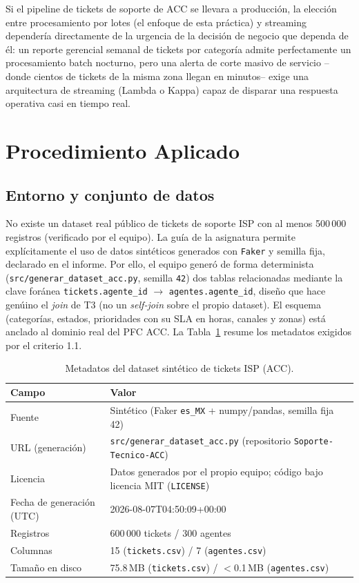 \documentclass[11pt,a4paper]{article}
\begin{document}
Si el pipeline de tickets de soporte de ACC se llevara a producci\'on, la
elecci\'on entre procesamiento por lotes (el enfoque de esta pr\'actica) y
streaming depender\'ia directamente de la urgencia de la decisi\'on de
negocio que dependa de \'el: un reporte gerencial semanal de tickets por
categor\'ia admite perfectamente un procesamiento batch nocturno, pero una
alerta de corte masivo de servicio --donde cientos de tickets de la misma
zona llegan en minutos-- exige una arquitectura de streaming (Lambda o Kappa)
capaz de disparar una respuesta operativa casi en tiempo real.

\section{Procedimiento Aplicado}
\label{sec:procedimiento}

\subsection{Entorno y conjunto de datos}
\label{sec:dataset}

No existe un dataset real p\'ublico de tickets de soporte ISP con al menos
500\,000 registros (verificado por el equipo). La gu\'ia de la asignatura
permite expl\'icitamente el uso de datos sint\'eticos generados con
\texttt{Faker} y semilla fija, declarado en el informe. Por ello, el equipo
gener\'o de forma determinista (\texttt{src/generar\_dataset\_acc.py},
semilla \texttt{42}) dos tablas relacionadas mediante la clave for\'anea
\texttt{tickets.agente\_id} $\rightarrow$ \texttt{agentes.agente\_id}, dise\~no
que hace gen\'uino el \emph{join} de T3 (no un \emph{self-join} sobre el
propio dataset). El esquema (categor\'ias, estados, prioridades con su SLA en
horas, canales y zonas) est\'a anclado al dominio real del PFC ACC. La
Tabla~\ref{tab:dataset} resume los metadatos exigidos por el criterio 1.1.

\begin{table}[htbp]
\centering
\caption{Metadatos del dataset sint\'etico de tickets ISP (ACC).}
\label{tab:dataset}
\begin{tabular}{@{}p{3.3cm}p{9.5cm}@{}}
\toprule
\textbf{Campo} & \textbf{Valor} \\
\midrule
Fuente & Sint\'etico (Faker \texttt{es\_MX} + numpy/pandas, semilla fija 42) \\
URL (generaci\'on) & \texttt{src/generar\_dataset\_acc.py} (repositorio \texttt{Soporte-Tecnico-ACC}) \\
Licencia & Datos generados por el propio equipo; c\'odigo bajo licencia MIT (\texttt{LICENSE}) \\
Fecha de generaci\'on (UTC) & 2026-08-07T04:50:09+00:00 \\
Registros & 600\,000 tickets / 300 agentes \\
Columnas & 15 (\texttt{tickets.csv}) / 7 (\texttt{agentes.csv}) \\
Tama\~no en disco & 75.8\,MB (\texttt{tickets.csv}) / $<$0.1\,MB (\texttt{agentes.csv}) \\
\bottomrule
\end{tabular}
\end{table}
\end{document}
